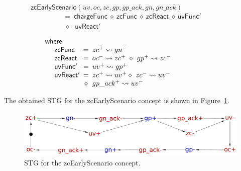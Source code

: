 \documentclass[british, journal]{IEEEtran}
\begin{document}
\vspace{-4mm}
\[
\mathsf{zcEarlyScenario}(uv,oc,zc,gp,gp\_ack,gn,gn\_ack)~~~~~~~~~~~~~~~~~~~~~~~~~~~~~~~
\]
\vspace{-5mm}
\[
\begin{array}{lcl}
~~=~\mathsf{chargeFunc}~\diamond~\mathsf{zcFunc}~\diamond~\mathsf{zcReact}~\diamond~\mathsf{uvFunc'}\\
~~~\!\diamond~~~\!\!\mathsf{uvReact'}\\
\end{array}
\]
\vspace{-4mm}
\[
\begin{array}{lcl}
\mathsf{where}&~&\\

~~~~\mathsf{zcFunc}&\hspace{-2mm}=&\hspace{-2mm}zc^{+}\rightsquigarrow gn^{-}\\
~~~~\mathsf{zcReact}&\hspace{-2mm}=&\hspace{-2mm}oc^{-}\rightsquigarrow zc^{+}~\diamond~gp^{+}\rightsquigarrow zc^{-}~~~~~~~~~~~~~~~~~~~\\
~~~~\mathsf{uvFunc'}&\hspace{-2mm}=&\hspace{-2mm}uv^{+}\rightsquigarrow gp^{+}\\
~~~~\mathsf{uvReact'}&\hspace{-2mm}=&\hspace{-2mm}zc^{+}\rightsquigarrow uv^{+}
\diamond~zc^{-}\rightsquigarrow uv^{-}\\
&\hspace{-2mm}\diamond&\hspace{-2mm}gp\_ack^{+}\rightsquigarrow uv^{-}

\end{array}
\]

The obtained STG for the \textsf{zcEarlyScenario} concept is shown
in Figure~\ref{fig:zcEarlyScenario STG}.

\begin{figure}[H]
\begin{centering}
\includegraphics[scale=0.23]{Images/stg-UV_after_ZC}
\par\end{centering}
\protect\caption{\label{fig:zcEarlyScenario STG}STG for the \textsf{zcEarlyScenario} concept.}
\vspace{-3mm}
\end{figure}
\end{document}
